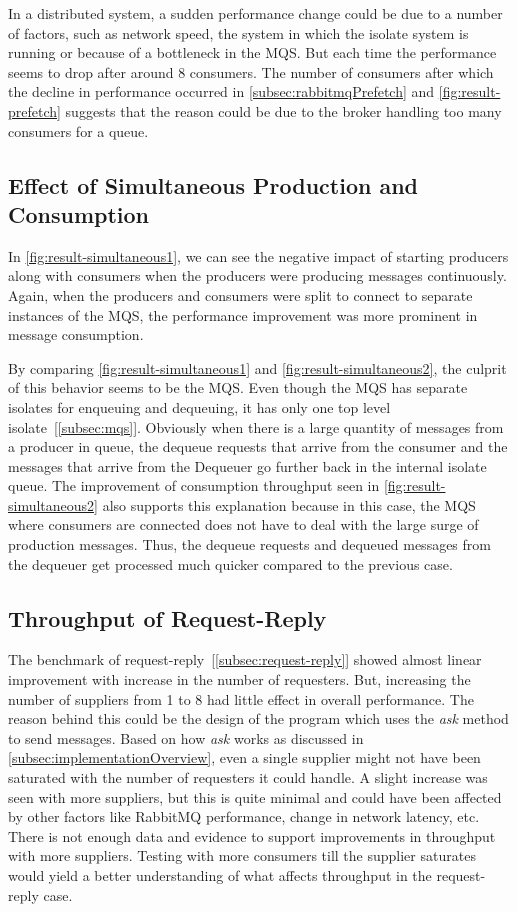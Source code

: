   In a distributed system, a sudden performance change could be due to a number of factors, such as network speed, the system in which the isolate system is running or because of a bottleneck in the MQS. But each time the performance seems to drop after around 8 consumers. The number of consumers after which the decline in performance occurred in \autoref{subsec:rabbitmqPrefetch} and \autoref{fig:result-prefetch} suggests that the reason could be due to the broker handling too many consumers for a queue.

\subsection{Effect of Simultaneous Production and Consumption}
In \autoref{fig:result-simultaneous1}, we can see the negative impact of starting producers along with consumers when the producers were producing messages continuously. Again, when the producers and consumers were split to connect to separate instances of the MQS, the performance improvement was more prominent in message consumption.

  By comparing \autoref{fig:result-simultaneous1} and \autoref{fig:result-simultaneous2}, the culprit of this behavior seems to be the MQS. Even though the MQS has separate isolates for enqueuing and dequeuing, it has only one top level isolate~[\autoref{subsec:mqs}]. Obviously when there is a large quantity of messages from a producer in queue, the dequeue requests that arrive from the consumer and the messages that arrive from the Dequeuer go further back in the internal isolate queue. The improvement of consumption throughput seen in
   \autoref{fig:result-simultaneous2} also supports this explanation because in this case, the MQS where consumers are connected does not have to deal with the large surge of production messages. Thus, the dequeue requests and dequeued messages from the dequeuer get processed much quicker compared to the previous case.

\subsection{Throughput of Request-Reply}
  The benchmark of request-reply~[\autoref{subsec:request-reply}] showed almost linear improvement with increase in the number of requesters. But, increasing the number of suppliers from 1 to 8 had little effect in overall performance. The reason behind this could be the design of the program which uses the \emph{ask} method to send messages. Based on how \emph{ask} works as discussed in \autoref{subsec:implementationOverview}, even a single supplier might not have been saturated with the number of requesters it could handle. A slight increase was seen with more suppliers, but this is quite minimal and could have been affected by other factors like RabbitMQ performance, change in network latency, etc. There is not enough data and evidence to support improvements in throughput with more suppliers. Testing with more consumers till the supplier saturates would yield a better understanding of what affects throughput in the request-reply case.

